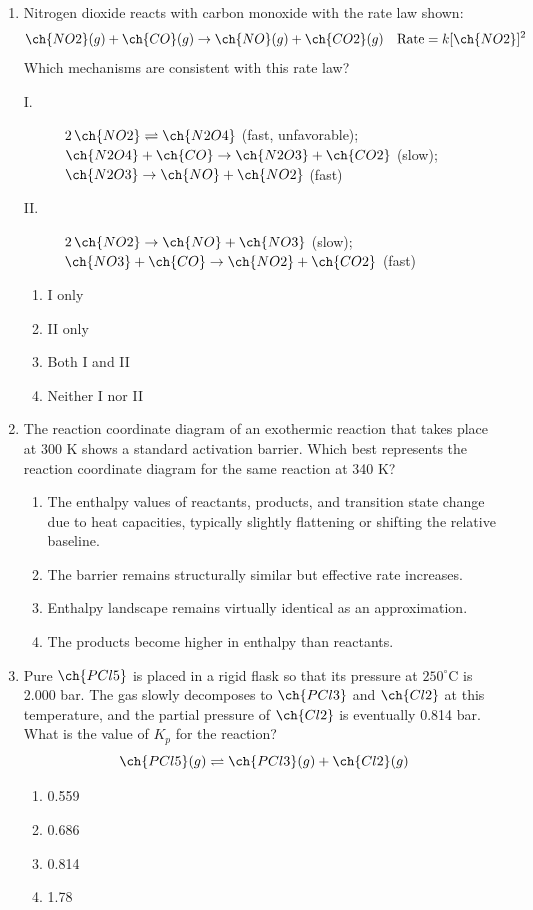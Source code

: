 \documentclass[twocolumn,10pt]{article}
\begin{document}
\begin{enumerate}[label=\arabic*., leftmargin=*]
\item Nitrogen dioxide reacts with carbon monoxide with the rate law shown:
\[ \ch{NO2}(g) + \ch{CO}(g) \rightarrow \ch{NO}(g) + \ch{CO2}(g) \quad \text{Rate} = k[\ch{NO2}]^2 \]
Which mechanisms are consistent with this rate law?
\begin{description}
    \item[I.] $2\,\ch{NO2} \rightleftharpoons \ch{N2O4}$ (fast, unfavorable); $\ch{N2O4} + \ch{CO} \rightarrow \ch{N2O3} + \ch{CO2}$ (slow); $\ch{N2O3} \rightarrow \ch{NO} + \ch{NO2}$ (fast)
    \item[II.] $2\,\ch{NO2} \rightarrow \ch{NO} + \ch{NO3}$ (slow); $\ch{NO3} + \ch{CO} \rightarrow \ch{NO2} + \ch{CO2}$ (fast)
\end{description}
\begin{enumerate}[label=(\Alph*)]
    \item I only \item II only \item Both I and II \item Neither I nor II
\end{enumerate}

\item The reaction coordinate diagram of an exothermic reaction that takes place at 300 K shows a standard activation barrier. Which best represents the reaction coordinate diagram for the same reaction at 340 K?
\begin{enumerate}[label=(\Alph*)]
    \item The enthalpy values of reactants, products, and transition state change due to heat capacities, typically slightly flattening or shifting the relative baseline.
    \item The barrier remains structurally similar but effective rate increases.
    \item Enthalpy landscape remains virtually identical as an approximation.
    \item The products become higher in enthalpy than reactants.
\end{enumerate}

\item Pure $\ch{PCl5}$ is placed in a rigid flask so that its pressure at $250^\circ\text{C}$ is 2.000 bar. The gas slowly decomposes to $\ch{PCl3}$ and $\ch{Cl2}$ at this temperature, and the partial pressure of $\ch{Cl2}$ is eventually 0.814 bar. What is the value of $K_p$ for the reaction?
\[ \ch{PCl5}(g) \rightleftharpoons \ch{PCl3}(g) + \ch{Cl2}(g) \]
\begin{enumerate}[label=(\Alph*)]
    \item 0.559 \item 0.686 \item 0.814 \item 1.78
\end{enumerate}


\end{enumerate}
\end{document}

